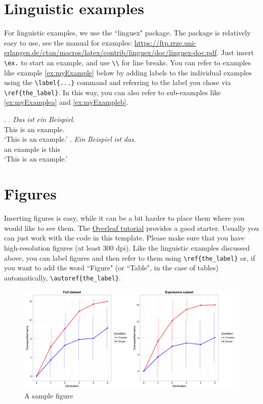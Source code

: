\begin{itemize}
\end{itemize}


\section{Linguistic examples} \label{sec:linguex}

For linguistic examples, we use the ``linguex" package. The package is relatively easy to use, see the manual for examples: \url{https://ftp.rrze.uni-erlangen.de/ctan/macros/latex/contrib/linguex/doc/linguex-doc.pdf}. Just insert \verb!\ex.! to start an example, and use \verb!\\! for line breaks. You can refer to examples like example \ref{ex:myExample} below by adding labels to the individual examples using the \verb!\label{...}! command and referring to the label you chose via \verb!\ref{the_label}!. In this way, you can also refer to sub-examples like \ref{ex:myExamplea} and \ref{ex:myExampleb}.
 
\ex. \label{ex:myExample}
 \ag. \textit{Das} \textit{ist} \textit{ein} \textit{Beispiel}. \\
  This is an example. \\
  `This is an example.' \label{ex:myExamplea}
  \bg. \textit{Ein} \textit{Beispiel} \textit{ist} \textit{das}. \\
  an example is this \\
  `This is an example.' \label{ex:myExampleb}


\section{Figures}

Inserting figures is easy, while it can be a bit harder to place them where you would like to see them. The \href{https://www.overleaf.com/learn/latex/Inserting_Images}{Overleaf tutorial} provides a good starter. Usually you can just work with the code in this template. Please make sure that you have high-resolution figures (at least 300 dpi). Like the linguistic examples discussed above, you can label figures and then refer to them using \verb!\ref{the_label}! or, if you want to add the word ``Figure" (or ``Table", in the case of tables) automatically, \verb!\autoref{the_label}!.


\begin{figure}[H]
    \centering
    \includegraphics[width=\textwidth]{Figures/Figure2.png}
    \caption{A sample figure}
    \label{fig:my_first_figure}
\end{figure}


